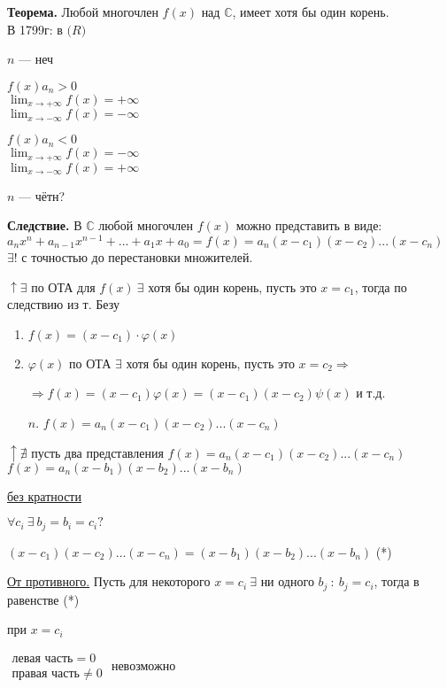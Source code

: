 \documentclass{article}
\begin{document}
    \textbf{Теорема.} Любой многочлен \(f(x)\) над \(\mathbb{C}\), имеет хотя бы один корень. \\

    В 1799г: в \(\mathbb(R)\)
    
    \(n\) --- неч

    \(f(x) a_n > 0\)\\
    \(\lim_{x \to +\infty} f(x) = +\infty\)\\
    \(\lim_{x \to -\infty} f(x) = -\infty\)

    \(f(x) a_n < 0\)\\
    \(\lim_{x \to +\infty} f(x) = -\infty\)\\
    \(\lim_{x \to -\infty} f(x) = +\infty\)

    \(n\) --- чётн?

    \textbf{Следствие.} В \(\mathbb{C}\) любой многочлен \(f(x)\) можно представить в виде: \( a_{n}x^{n} + a_{n-1}x^{n-1} + ... + a_1x + a_0 = f(x) = a_{n}(x - c_1)(x - c_2)...(x - c_n)\)
    \(\exists!\) с точностью до перестановки множителей.

    \(\uparrow \exists\) по ОТА для \(f(x)\ \exists\) хотя бы один корень, пусть это \(x = c_1\), тогда по следствию из т. Безу
    \begin{enumerate}
        \item \(f(x) = (x-c_1)\cdot \varphi(x)\)
        \item \(\varphi(x)\) по ОТА \(\exists\) хотя бы один корень, пусть это \(x = c_2 \Rightarrow\)
        
        \(\Rightarrow f(x) = (x-c_1)\varphi(x) = (x-c_1)(x-c_2)\psi(x)\) и т.д.
        \item[\(n\).] \(f(x) = a_n(x-c_1)(x-c_2)...(x-c_n)\)
    \end{enumerate}
    

    \(\uparrow \nexists\) пусть два представления
    \( f(x) = a_n(x-c_1)(x-c_2)...(x-c_n) \)
    \( f(x) = a_n(x-b_1)(x-b_2)...(x-b_n) \)
    
    \underline{без кратности}
    
    \(\forall c_i\  \exists\ b_j = b_i = c_i ?\)
    
    \( (x-c_1)(x-c_2)...(x-c_n) = (x-b_1)(x-b_2)...(x-b_n) \) (*)
    
    \underline{От противного.} Пусть для некоторого \(x = c_i\ \exists\) ни одного \(b_j\ :\ b_j = c_i\), тогда в равенстве (*)

    при \(x = c_i\)
    
    \(\begin{array}{l}
        \textrm{левая часть} = 0\\
        \textrm{правая часть} \neq 0
    \end{array}\) невозможно
\end{document}
